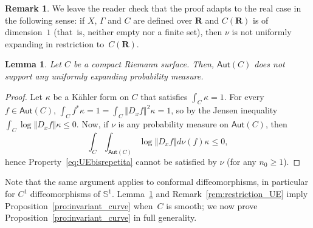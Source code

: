 \documentclass[11pt]{article}
\newcommand{\norm}[1]{{\left\Vert#1\right\Vert}}
\def\R{\mathbf{R}}
\newcommand\Aut{\mathsf{Aut}}
\theoremstyle{plain}
\newtheorem{lem}[thm]{Lemma}
\theoremstyle{definition}
\newtheorem{rem}[thm]{Remark}
\numberwithin{equation}{section}
\begin{document}
\begin{rem}\label{rem:invariant_curve}
We leave the reader check that the proof adapts to the real case in the following sense: if $X$, $\Gamma$ and $C$ are defined over $\R$ and $C(\R)$ is of dimension~$1$ (that~is, neither empty nor a finite set), then $\nu$ is not uniformly expanding in restriction to~$C(\R)$.
\end{rem}

\begin{lem} \label{lem:criterion_chung_curves}
Let $C$ be a compact Riemann surface. Then, $\Aut(C)$ does not support any uniformly expanding probability measure.
\end{lem}

\begin{proof}
Let $\kappa$ be a Kähler form on $C$ that satisfies $\int_C\kappa = 1$. For every $f\in \Aut(C)$,
$\int_C f^*\kappa = 1= \int_C \norm{D_xf}^2 \kappa= 1$, so by the Jensen inequality
$\int_C \log \norm{D_xf } \kappa\leq 0$. Now, if $\nu$ is any probability measure on $\Aut(C)$, then
\[
\int_C \int_{\Aut(C)} \log \norm{D_xf } d\nu(f) \kappa\leq 0,
\]
hence Property~\eqref{eq:UEbisrepetita} cannot be satisfied
by $\nu$ (for any $n_0\geq 1$).
\end{proof}

Note that the same argument applies to conformal diffeomorphisms, in particular for $C^1$
diffeomorphisms of $\mathbb S^1$. Lemma~\ref{lem:criterion_chung_curves} and Remark~\ref{rem:restriction_UE}
imply Proposition~\ref{pro:invariant_curve} when~$C$ is smooth; we now prove Proposition~\ref{pro:invariant_curve} in full generality.
\end{document}
